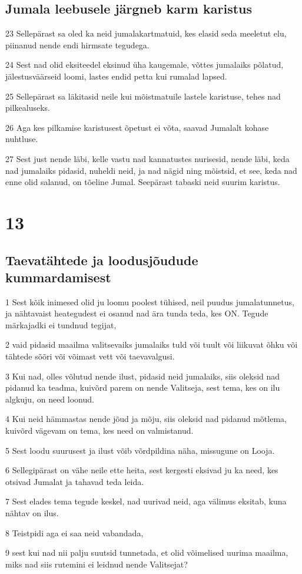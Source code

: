 \section*{Jumala leebusele järgneb karm karistus}

\par 23 Sellepärast sa oled ka neid jumalakartmatuid, kes elasid seda meeletut elu, piinanud nende endi hirmsate tegudega.
\par 24 Sest nad olid eksiteedel eksinud üha kaugemale, võttes jumalaiks põlatud, jälestusväärseid loomi, lastes endid petta kui rumalad lapsed.
\par 25 Sellepärast sa läkitasid neile kui mõistmatuile lastele karistuse, tehes nad pilkealuseks.
\par 26 Aga kes pilkamise karistusest õpetust ei võta, saavad Jumalalt kohase nuhtluse.
\par 27 Sest just nende läbi, kelle vastu nad kannatustes nurisesid, nende läbi, keda nad jumalaiks pidasid, nuheldi neid, ja nad nägid ning mõistsid, et see, keda nad enne olid salanud, on tõeline Jumal. Seepärast tabaski neid suurim karistus. 

\chapter{13} 

\section*{Taevatähtede ja loodusjõudude kummardamisest}

\par 1 Sest kõik inimesed olid ju loomu poolest tühised, neil puudus jumalatunnetus, ja nähtavaist heategudest ei osanud nad ära tunda teda, kes ON. Tegude märkajadki ei tundnud tegijat,
\par 2 vaid pidasid maailma valitsevaiks jumalaiks tuld või tuult või liikuvat õhku või tähtede sõõri või võimast vett või taevavalgusi.
\par 3 Kui nad, olles võlutud nende ilust, pidasid neid jumalaiks, siis oleksid nad pidanud ka teadma, kuivõrd parem on nende Valitseja, sest tema, kes on ilu algkuju, on need loonud.
\par 4 Kui neid hämmastas nende jõud ja mõju, siis oleksid nad pidanud mõtlema, kuivõrd vägevam on tema, kes need on valmistanud.
\par 5 Sest loodu suurusest ja ilust võib võrdpildina näha, missugune on Looja.
\par 6 Sellegipärast on vähe neile ette heita, sest kergesti eksivad ju ka need, kes otsivad Jumalat ja tahavad teda leida.
\par 7 Sest elades tema tegude keskel, nad uurivad neid, aga välimus eksitab, kuna nähtav on ilus.
\par 8 Teistpidi aga ei saa neid vabandada,
\par 9 sest kui nad nii palju suutsid tunnetada, et olid võimelised uurima maailma, miks nad siis rutemini ei leidnud nende Valitsejat? 


